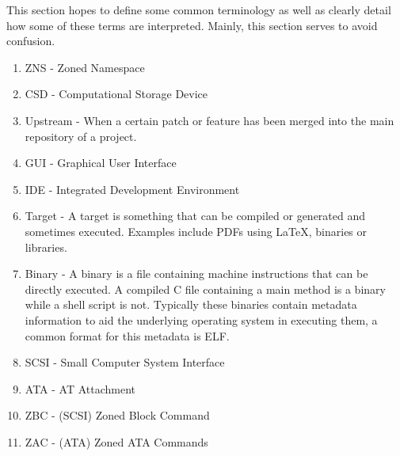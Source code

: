 \documentclass[conference]{IEEEtran}
\begin{document}
This section hopes to define some common terminology as well as clearly detail
how some of these terms are interpreted. Mainly, this section serves to avoid
confusion.

\begin{enumerate}
	\item ZNS      - Zoned Namespace
	\item CSD      - Computational Storage Device
	\item Upstream - When a certain patch or feature has been merged into the
					 main repository of a project.
	\item GUI      - Graphical User Interface
	\item IDE      - Integrated Development Environment
	\item Target   - A target is something that can be compiled or generated and
					 sometimes executed. Examples include PDFs using LaTeX,
					 binaries or libraries.
	\item Binary   - A binary is a file containing machine instructions that can
					 be directly executed. A compiled C file containing a main
					 method is a binary while a shell script is not. Typically
					 these binaries contain metadata information to aid the
					 underlying operating system in executing them, a common
					 format for this metadata is ELF.
	\item SCSI     - Small Computer System Interface
	\item ATA      - AT Attachment
	\item ZBC      - (SCSI) Zoned Block Command
	\item ZAC      - (ATA) Zoned ATA Commands
\end{enumerate}





\end{document}
